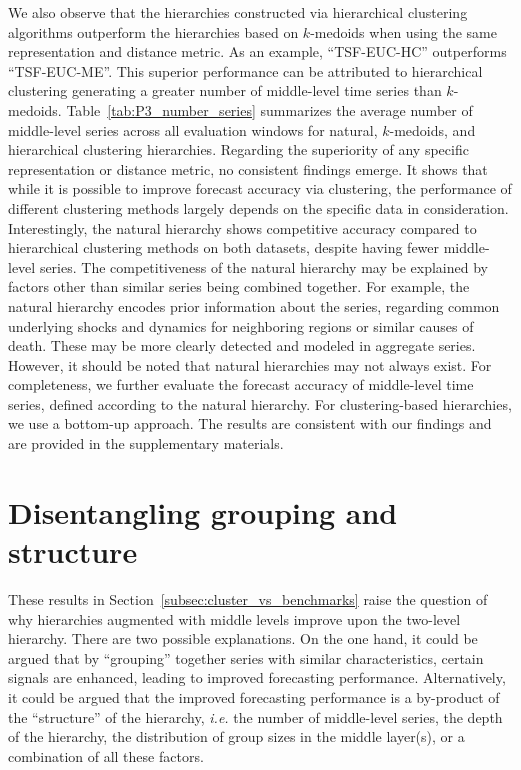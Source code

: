 \documentclass[a4paper,review,12pt,authoryear]{elsarticle}
\begin{document}
We also observe that the hierarchies constructed via hierarchical clustering algorithms outperform the hierarchies based on $k$-medoids when using the same representation and distance metric. As an example, ``TSF-EUC-HC'' outperforms ``TSF-EUC-ME''.
This superior performance can be attributed to hierarchical clustering generating a greater number of middle-level time series than $k$-medoids.
Table~\ref{tab:P3_number_series} summarizes the average number of middle-level series across all evaluation windows for natural, $k$-medoids, and hierarchical clustering hierarchies. Regarding the superiority of any specific representation or distance metric, no consistent findings emerge. It shows that while it is possible to improve forecast accuracy via clustering, the performance of different clustering methods largely depends on the specific data in consideration.
Interestingly, the natural hierarchy shows competitive accuracy compared to hierarchical clustering methods on both datasets, despite having fewer middle-level series. { The competitiveness of the natural hierarchy may be explained by factors other than similar series being combined together. For example, the natural hierarchy encodes prior information about the series, regarding common underlying shocks and dynamics for neighboring regions or similar causes of death. These may be more clearly detected and modeled in aggregate series.} However, it should be noted that natural hierarchies may not always exist. { For completeness, we further evaluate the forecast accuracy of middle-level time series, defined according to the natural hierarchy. For clustering-based hierarchies, we use a bottom-up approach. The results are consistent with our findings and are provided in the supplementary materials. } 








\section{Disentangling  grouping and structure}
\label{sec:permutation}

These results in Section~\ref{subsec:cluster_vs_benchmarks} raise the question of why hierarchies augmented with middle levels improve upon the two-level hierarchy. There are two possible explanations.  On the one hand, it could be argued that by ``grouping'' together series with similar characteristics, certain signals are enhanced, leading to improved forecasting performance.
Alternatively, it could be argued that the improved forecasting performance is a by-product of the ``structure'' of the hierarchy, \textit{i.e.} the number of middle-level series, the depth of the hierarchy, the distribution of group sizes in the middle layer(s), or a combination of all these factors.
\end{document}
